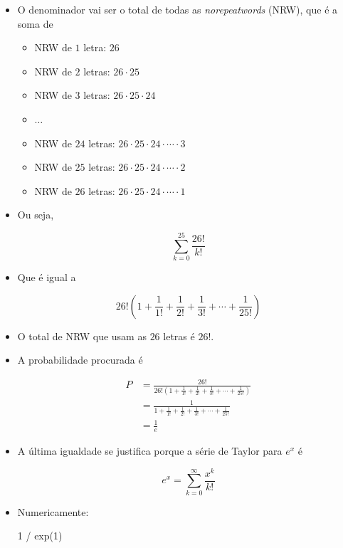 \documentclass[
  11pt]{report}
\newenvironment{Shaded}{\begin{snugshade}}{\end{snugshade}}
\newcommand{\DecValTok}[1]{\textcolor[rgb]{0.00,0.00,0.81}{#1}}
\newcommand{\FunctionTok}[1]{\textcolor[rgb]{0.00,0.00,0.00}{#1}}
\newcommand{\NormalTok}[1]{#1}
\newcommand{\SpecialCharTok}[1]{\textcolor[rgb]{0.00,0.00,0.00}{#1}}
\providecommand{\tightlist}{%
  \setlength{\itemsep}{0pt}\setlength{\parskip}{0pt}}
\renewenvironment{Shaded}{
    \begin{mdframed}[%
      roundcorner=2pt,%
      innerleftmargin=5pt,%
      innerrightmargin=5pt,%
      topline=true,%
      leftline=true,%
      rightline=true,%
      bottomline=true,%
      linewidth=0.5pt,%
      linecolor=black!20,%
      backgroundcolor=black!2,%
      skipabove=2ex,%
      skipbelow=2.5ex%
    ]%
  }
  {
    \end{mdframed}
  }
\begin{document}
\begin{itemize}
\item
  O denominador vai ser o total de todas as \emph{norepeatwords} (NRW), que é a soma de

  \begin{itemize}
  \tightlist
  \item
    NRW de $1$ letra: $26$
  \item
    NRW de $2$ letras: $26 \cdot 25$
  \item
    NRW de $3$ letras: $26 \cdot 25 \cdot 24$
  \item
    $\dots$
  \item
    NRW de $24$ letras: $26 \cdot 25 \cdot 24 \cdot \cdots \cdot 3$
  \item
    NRW de $25$ letras: $26 \cdot 25 \cdot 24 \cdot \cdots \cdot 2$
  \item
    NRW de $26$ letras: $26 \cdot 25 \cdot 24 \cdot \cdots \cdot 1$
  \end{itemize}
\item
  Ou seja,

  \[
  \sum_{k=0}^{25} \frac{26!}{k!}
  \]
\item
  Que é igual a

  \[
  26! 
  \left( 
  1 + \frac{1}{1!} + \frac{1}{2!} + \frac{1}{3!} + \cdots + \frac{1}{25!} 
  \right)
  \]
\item
  O total de NRW que usam as $26$ letras é $26!$.
\item
  A probabilidade procurada é

  \[
  \begin{aligned}
  P 
  &= 
  \frac{26!}{
  26! 
  \left( 
  1 + \frac{1}{1!} + \frac{1}{2!} + \frac{1}{3!} + \cdots + \frac{1}{25!} 
  \right)
  } \\
  &=
  \frac{1}{
  1 + \frac{1}{1!} + \frac{1}{2!} + \frac{1}{3!} + \cdots + \frac{1}{25!} 
  } \\
  &= \frac1e
  \end{aligned}
  \]
\item
  A última igualdade se justifica porque a série de Taylor para $e^x$ é

  \[
  e^x = \sum_{k=0}^\infty \frac{x^k}{k!}
  \]
\item
  Numericamente:

\begin{Shaded}
\begin{Highlighting}[]
\DecValTok{1} \SpecialCharTok{/} \FunctionTok{exp}\NormalTok{(}\DecValTok{1}\NormalTok{)}
\end{Highlighting}
\end{Shaded}


\end{itemize}
\end{document}
